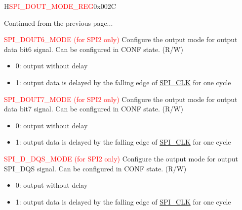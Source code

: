 \addtocounter{Regfloat}{-1}
\begin{register}{H}{\textcolor{red}{SPI\_DOUT\_MODE\_REG}}{0x{}002C}
\begin{regdesc}\begin{reglist}
\item [Continued from the previous page...]

\label{fielddesc:SPIDOUT6MODE}\item [\textcolor{red}{SPI\_DOUT6\_MODE  (for SPI2 only)}] Configure the output mode for output data bit6 signal. Can be configured in CONF state. (R/W)

\begin{itemize}
    \item 0: output without delay
    \item 1: output data is delayed by the falling edge of \hyperref[clk:SPICLK]{SPI\_CLK} for one cycle
\end{itemize}

\label{fielddesc:SPIDOUT7MODE}\item [\textcolor{red}{SPI\_DOUT7\_MODE  (for SPI2 only)}] Configure the output mode for output data bit7 signal. Can be configured in CONF state. (R/W)

\begin{itemize}
    \item 0: output without delay
    \item 1: output data is delayed by the falling edge of \hyperref[clk:SPICLK]{SPI\_CLK} for one cycle
\end{itemize}

\label{fielddesc:SPIDDQSMODE}\item [\textcolor{red}{SPI\_D\_DQS\_MODE  (for SPI2 only)}]
Configure the output mode for output SPI\_DQS signal. Can be configured in CONF state. (R/W)

\begin{itemize}
    \item 0: output without delay
    \item 1: output data is delayed by the falling edge of \hyperref[clk:SPICLK]{SPI\_CLK} for one cycle
\end{itemize}

\end{reglist}\end{regdesc}
\end{register}



